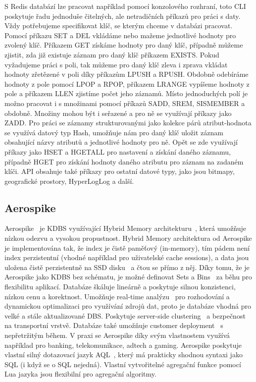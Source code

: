 \documentclass[czech,master,dept460,male,csharp,cpdeclaration]{diploma}
\begin{document}
	S Redis databází lze pracovat například pomocí konzolového rozhraní, toto CLI~\cite{rediscli} poskytuje řadu jednoduše čitelných, ale netradičních příkazů pro práci s daty. Vždy potřebujeme specifikovat klíč, se kterým chceme v databázi pracovat. Pomocí příkazu SET a DEL vkládáme nebo mažeme jednotlivé hodnoty pro zvolený klíč. Příkazem GET získáme hodnoty pro daný klíč, případně můžeme zjistit, zda již existuje záznam pro daný klíč příkazem EXISTS. Pokud vyžadujeme práci s poli, tak můžeme pro daný klíč zleva i zprava vkládat hodnoty zřetězené v poli díky příkazům LPUSH a RPUSH. Obdobně odebíráme hodnoty z pole pomocí LPOP a RPOP, příkazem LRANGE vypíšeme hodnoty z pole a příkazem LLEN zjistíme počet jeho záznamů. Místo jednoduchých polí je možno pracovat i s množinami pomocí příkazů SADD, SREM, SISMEMBER a obdobně. Množiny mohou být i seřazené a pro ně se využívají příkazy jako ZADD. Pro práci se záznamy strukturovanými jako kolekce párů atribut-hodnota se využívá datový typ Hash, umožňuje nám pro daný klíč uložit záznam obsahující názvy atributů a jednotlivé hodnoty pro ně. Opět se zde využívají příkazy jako HSET a HGETALL pro nastavení a získání daného záznamu, případně HGET pro získání hodnoty daného atributu pro záznam na zadaném klíči. API obsahuje také příkazy pro ostatní datové typy, jako jsou bitmapy, geografické prostory, HyperLogLog a další.
	
	\subsection{Aerospike} \label{lab-aerospike}
	
	Aerospike~\cite{aerospike} je KDBS využívající Hybrid Memory architekturu~\cite{hybmem-arch}, která umožňuje nízkou odezvu a vysokou propustnost. Hybrid Memory architektura od Aerospike je implementována tak, že index je čistě paměťový (in-memory), tím pádem není index perzistentní (vhodné například pro uživatelské cache sessions), a data jsou uložena čistě perzistentně na SSD disku~\cite{ssd-avast} a čtou se přímo z něj. Díky tomu, že je Aerospike jako KDBS bez schématu, je možné definovat Sets a Bins~\cite{aerospike-datamodel} za běhu pro flexibilitu aplikací. Databáze škáluje lineárně a poskytuje silnou konzistenci, nízkou cenu a korektnost. Umožňuje real-time analýzu~\cite{aerospike-rtanalysis} pro rozhodování a dynamickou optimalizaci pro využívání zdrojů dat, proto je databáze vhodná pro velké a stále aktualizované DBS. Poskytuje server-side clustering~\cite{aerospike-clustering} a bezpečnost na transportní vrstvě. Databáze také umožňuje customer deployment~\cite{aerospike-deployment} s nepřetržitým během. V praxi se Aerospike díky svým vlastnostem využívá například pro banking, telekomunikace, adtech a gaming. Aerospike poskytuje vlastní silný dotazovací jazyk AQL~\cite{aql}, který má prakticky shodnou syntaxi jako SQL (i když se o SQL nejedná). Vlastní vytvořitelné agregační funkce pomocí Lua jazyka jsou flexibilní pro agregační algoritmy.
	
\end{document}
